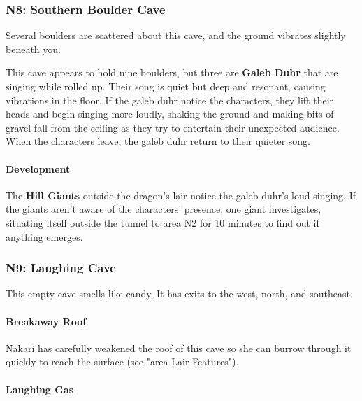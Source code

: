 \documentclass[letterpaper, 11pt, twocolumn]{dndbook}
\begin{document}
\subsubsection{N8: Southern Boulder Cave}

\begin{DndReadAloud}
Several boulders are scattered about this cave, and the ground vibrates slightly beneath you.
\end{DndReadAloud}

This cave appears to hold nine boulders, but three are \textbf{Galeb Duhr} that are singing while rolled up. Their song is quiet but deep and resonant, causing vibrations in the floor. If the galeb duhr notice the characters, they lift their heads and begin singing more loudly, shaking the ground and making bits of gravel fall from the ceiling as they try to entertain their unexpected audience. When the characters leave, the galeb duhr return to their quieter song.

\paragraph{Development}

The \textbf{Hill Giants} outside the dragon's lair notice the galeb duhr's loud singing. If the giants aren't aware of the characters' presence, one giant investigates, situating itself outside the tunnel to area N2 for 10 minutes to find out if anything emerges.

\subsubsection{N9: Laughing Cave}

\begin{DndReadAloud}
This empty cave smells like candy. It has exits to the west, north, and southeast.
\end{DndReadAloud}

\paragraph{Breakaway Roof}

Nakari has carefully weakened the roof of this cave so she can burrow through it quickly to reach the surface (see "area Lair Features").

\paragraph{Laughing Gas}
\end{document}
